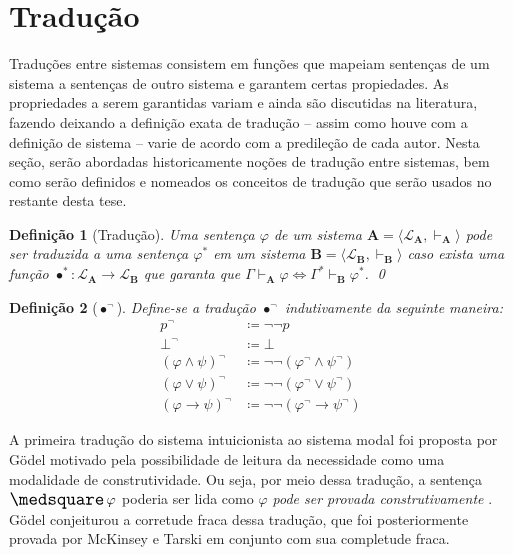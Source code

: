 \documentclass{report}
\newtheorem{definition}{Definição}
\begin{document}
    \section{Tradução}

    Traduções entre sistemas consistem em funções que mapeiam sentenças de um sistema a sentenças de outro sistema e garantem certas propiedades. As propriedades a serem garantidas variam e ainda são discutidas na literatura, fazendo deixando a definição exata de tradução -- assim como houve com a definição de sistema -- varie de acordo com a predileção de cada autor. Nesta seção, serão abordadas historicamente noções de tradução entre sistemas, bem como serão definidos e nomeados os conceitos de tradução que serão usados no restante desta tese.

    \begin{definition}[Tradução] 
        Uma sentença $\varphi$ de um sistema $\mathbf{A} = \langle \mathcal{L}_\mathbf{A}, \vdash_\mathbf{A}\rangle$ pode ser traduzida a uma sentença $\varphi^*$ em um sistema $\mathbf{B} = \langle \mathcal{L}_\mathbf{B}, \vdash_\mathbf{B} \rangle$ caso exista uma função $\bullet^* : \mathcal{L}_\mathbf{A} \to \mathcal{L}_\mathbf{B}$ que garanta que $\Gamma \vdash_\mathbf{A} \varphi \Leftrightarrow \Gamma^* \vdash_\mathbf{B} \varphi^*$.
        \qed
    \end{definition}

    \begin{definition}[$\bullet^\neg$] Define-se a tradução $\bullet^\neg$ indutivamente da seguinte maneira:
        \begin{align*}
            p^\neg                     & \coloneqq \neg\neg p                               \\
            \bot^\neg                  & \coloneqq \bot                                     \\
            (\varphi \wedge \psi)^\neg & \coloneqq \neg\neg (\varphi^\neg \wedge \psi^\neg) \\
            (\varphi \vee \psi)^\neg   & \coloneqq \neg\neg (\varphi^\neg \vee \psi^\neg)   \\
            (\varphi \to \psi)^\neg    & \coloneqq \neg\neg (\varphi^\neg \to \psi^\neg)
            \tag*{\qed} 
        \end{align*}
    \end{definition}

    A primeira tradução do sistema intuicionista ao sistema modal foi proposta por Gödel \cite{Gödel} motivado pela possibilidade de leitura da necessidade como uma modalidade de construtividade. Ou seja, por meio dessa tradução, a sentença $\nec \varphi$ poderia ser lida como \textit{$\varphi$ pode ser provada construtivamente} \cite{Troelstra}. Gödel conjeiturou a corretude fraca dessa tradução, que foi posteriormente provada por McKinsey e Tarski \cite{McKinsey} em conjunto com sua completude fraca.
\end{document}

